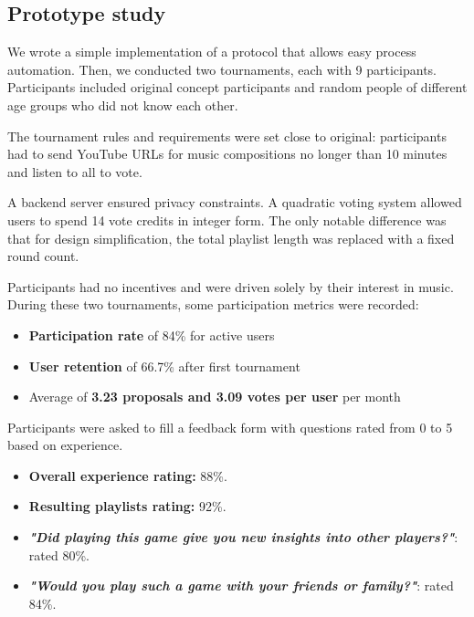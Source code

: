 \documentclass{article}
\begin{document}
\begin{CJK}{UTF8}{gbsn}
\begin{multicols}{2}
        \section{Prototype study}
        We wrote a simple implementation of a protocol that allows easy process automation. Then, we conducted two tournaments, each with 9 participants.
        Participants included original concept participants and random people of different age groups who did not know each other.

        The tournament rules and requirements were set close to original: participants had to send YouTube URLs for music compositions no longer than 10 minutes and listen to all to vote.

        A backend server ensured privacy constraints. A quadratic voting system allowed users to spend 14 vote credits in integer form. The only notable difference was that for design simplification, the total playlist length was replaced with a fixed round count.

        Participants had no incentives and were driven solely by their interest in music. During these two tournaments, some participation metrics were recorded:

        \begin{itemize}[nosep]
            \item \textbf{Participation rate} of 84\% for active users
            \item \textbf{User retention} of 66.7\% after first tournament
            \item Average of \textbf{3.23 proposals and 3.09 votes per user} per month
        \end{itemize}

        Participants were asked to fill a feedback form with questions rated from 0 to 5 based on experience.
        \begin{itemize}
            \setlength\itemsep{2px}
            \item \textbf{Overall experience rating:} 88\%.
            \item \textbf{Resulting playlists rating:} 92\%.
            \item \textbf{\textit{"Did playing this game give you new insights into other players?"}}: rated 80\%.
            \item \textbf{\textit{"Would you play such a game with your friends or family?"}}: rated 84\%.
        \end{itemize}


\end{multicols}
\end{CJK}
\end{document}

